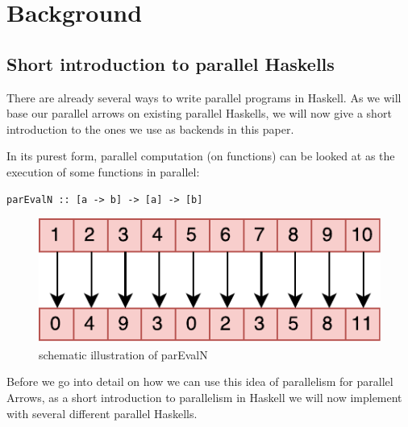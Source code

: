 \section{Background}
\label{sec:background}
\subsection{Short introduction to parallel Haskells}
There are already several ways to write parallel programs in Haskell. As we will base our parallel arrows on existing parallel Haskells, we will now give a short introduction to the ones we use as backends in this paper.

In its purest form, parallel computation (on functions) can be looked at as the execution of some functions  in parallel:

\begin{lstlisting}[frame=htrbl]
parEvalN :: [a -> b] -> [a] -> [b]
\end{lstlisting}
\begin{figure}[h]
	\includegraphics[scale=0.7]{images/parEvalN}
	\caption{schematic illustration of parEvalN}
	\label{fig:parEvalN}
\end{figure}
Before we go into detail on how we can use this idea of parallelism for parallel Arrows, as a short introduction to parallelism in Haskell we will now implement  with several different parallel Haskells.

